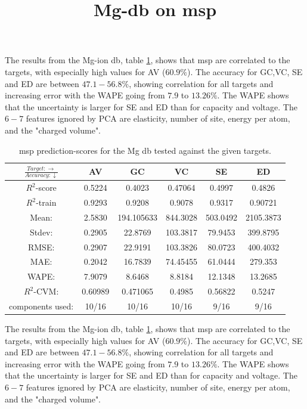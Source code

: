 The results from the Mg-ion db, table \ref{tab:mg-msp}, shows that msp are correlated to the targets, with especially high values for AV ($60.9\%$). The accuracy for GC,VC, SE and ED are between $47.1-56.8 \%$, showing correlation for all targets and increasing error with the WAPE going from $7.9$ to $13.26\%$. The WAPE shows that the uncertainty is larger for SE and ED than for capacity and voltage. The $6-7$ features ignored by PCA are elasticity,  number of site, energy per atom, and the "charged volume". 

\begin{table}[h]
\normalsize
\title{Mg-db on msp}
\centering
\caption{msp prediction-scores for the Mg db tested against the given targets.}
\begin{tabular}{|c|c|c|c|c|c|}
	\hline 
	$\frac{Target: \rightarrow}{Accuracy:\downarrow} $ & AV & GC & VC & SE & ED 
	 \\ 
	\hline
	$R^2$-score & 0.5224 & 0.4023 & 0.47064 & 0.4997 &  0.4826\\ 
	\hline 
	$R^2$-train & 0.9293 & 0.9208 & 0.9078 & 0.9317 &  0.90721 \\ 
	\hline
	Mean: &2.5830	&194.105633	&844.3028&503.0492&2105.3873	\\
	\hline 
	Stdev:&0.2905	&22.8769	&103.3817	&79.9453	&399.8795	\\
	\hline
	RMSE:&0.2907& 22.9191& 103.3826 & 80.0723 & 400.4032 \\ 
	\hline 
	MAE: &0.2042& 16.7839 &  74.45455 & 61.0444 & 279.353 \\ 
	\hline
	WAPE: & 7.9079 & 8.6468 & 8.8184  & 12.1348	& 13.2685 \\
	\hline
	$R^2$-CVM:&  0.60989 & 0.471065 & 0.4985  & 0.56822 &0.5247 \\
	\hline
	components used: & 10/16 & 10/16 & 10/16  & 9/16 &9/16 \\
	\hline
\end{tabular}
\label{tab:mg-msp}
\end{table}

The results from the Mg-ion db, table \ref{tab:mg-msp}, shows that msp are correlated to the targets, with especially high values for AV ($60.9\%$). The accuracy for GC,VC, SE and ED are between $47.1-56.8 \%$, showing correlation for all targets and increasing error with the WAPE going from $7.9$ to $13.26\%$. The WAPE shows that the uncertainty is larger for SE and ED than for capacity and voltage. The $6-7$ features ignored by PCA are elasticity,  number of site, energy per atom, and the "charged volume". 

